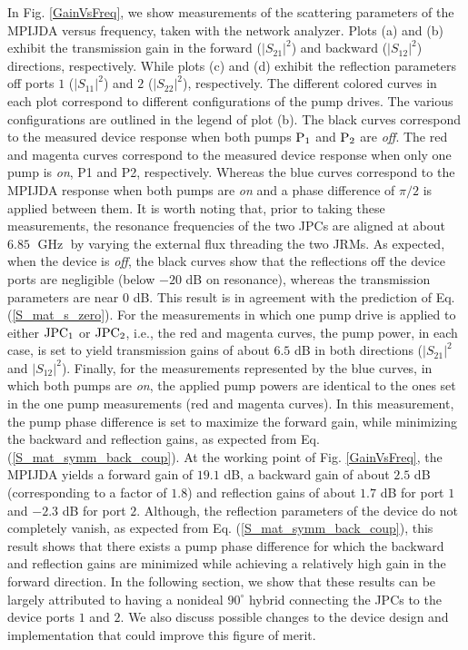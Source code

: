 \documentclass[aip,onecolumn,10pt]{revtex4}%
\begin{document}
In Fig. \ref{GainVsFreq}, we show measurements of the scattering parameters of the MPIJDA versus frequency, taken with the network analyzer. Plots (a) and (b) exhibit the transmission gain in the forward ($|S_{21}|^2$) and backward ($|S_{12}|^2$) directions, respectively. While plots (c) and (d) exhibit the reflection parameters off ports $1$ ($|S_{11}|^2$) and $2$ ($|S_{22}|^2$), respectively. The different colored curves in each plot correspond to different configurations of the pump drives. The various configurations are outlined in the legend of plot (b). The black curves correspond to the measured device response when both pumps $\rm{P_1}$ and $\rm{P_2}$ are \textit{off}. The red and magenta curves correspond to the measured device response when only one pump is \textit{on}, P1 and P2, respectively. Whereas the blue curves correspond to the MPIJDA response when both pumps are \textit{on} and a phase difference of $\pi/2$ is applied between them. It is worth noting that, prior to taking these measurements, the resonance frequencies of the two JPCs are aligned at about $6.85$ $\operatorname{GHz}$ by varying the external flux threading the two JRMs. As expected, when the device is \textit{off}, the black curves show that the reflections off the device ports are negligible (below $-20$ dB on resonance), whereas the transmission parameters are near $0$ dB. This result is in agreement with the prediction of Eq. (\ref{S_mat_s_zero}). For the measurements in which one pump drive is applied to either $\rm{JPC_1}$ or $\rm{JPC_2}$, i.e., the red and magenta curves, the pump power, in each case, is set to yield transmission gains of about $6.5$ dB in both directions ($|S_{21}|^2$ and $|S_{12}|^2$). Finally, for the measurements represented by the blue curves, in which both pumps are \textit{on}, the applied pump powers are identical to the ones set in the one pump measurements (red and magenta curves). In this measurement, the pump phase difference is set to maximize the forward gain, while minimizing the backward and reflection gains, as expected from Eq. (\ref{S_mat_symm_back_coup}). At the working point of Fig. \ref{GainVsFreq}, the MPIJDA yields a forward gain of $19.1$ dB, a backward gain of about $2.5$ dB (corresponding to a factor of $1.8$) and reflection gains of about $1.7$ dB for port $1$ and $-2.3$ dB for port $2$. Although, the reflection parameters of the device do not completely vanish, as expected from Eq. (\ref{S_mat_symm_back_coup}), this result shows that there exists a pump phase difference for which the backward and reflection gains are minimized while achieving a relatively high gain in the forward direction. In the following section, we show that these results can be largely attributed to having a nonideal $90^{\circ}$ hybrid connecting the JPCs to the device ports $1$ and $2$. We also discuss possible changes to the device design and implementation that could improve this figure of merit.  
\end{document}
